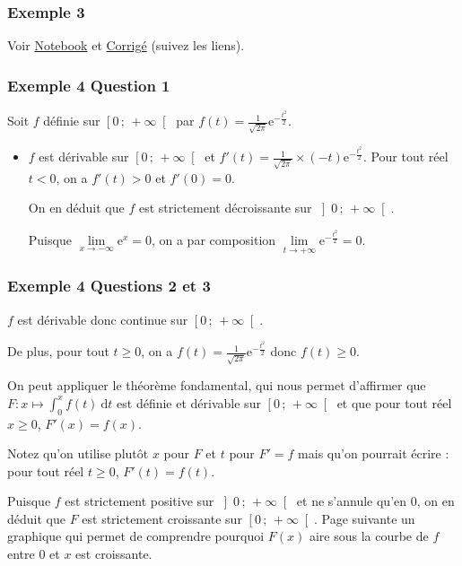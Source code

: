 \documentclass[11pt, hyperref={urlcolor=red,%
            linkcolor=blue, %
            colorlinks=true}]{beamer}
\newcommand{\Interoo}[2]{\left]#1\, ;\, #2\right[}
\newcommand{\Interfo}[2]{\left[#1\, ;\, #2\right[}
\newcommand{\dt}{\ensuremath{\text{d}t}}		%
\newcommand{\integralet}[3]{\int_{#1}^{#2} #3 \ \dt}
\begin{document}
\begin{frame}
\frametitle{Exemple 3}

Voir \href{https://mybinder.org/v2/gh/frederic-junier/TS-2019-2020/master?filepath=CalculIntegral/ressources/Cours_Calcul_Integral_2020_Eleve.ipynb}{Notebook} et  \href{https://frederic-junier.github.io/TS-2019-2020/CalculIntegral/ressources/Cours_Calcul_Integral_2020_Eleve-Corrige.pdf}{Corrigé} (suivez les liens).


\end{frame}



\begin{frame}
\frametitle{Exemple 4 Question 1}

Soit $f$ définie sur $\Interfo{0}{+\infty}$ par $f(t)=\frac{1}{\sqrt{2\pi}}\text{e}^{-\frac{t^2}{2}}$.

\begin{itemize}

\item $f$ est dérivable sur  $\Interfo{0}{+\infty}$ et $f'(t)=\frac{1}{\sqrt{2\pi}} \times (-t)\text{e}^{-\frac{t^2}{2}}$. Pour  tout réel $t<0$, on a $f'(t)>0$ et $f'(0)=0$.

On en déduit que $f$ est  strictement décroissante sur $\Interoo{0}{+\infty}$.

Puisque $\lim\limits_{x \to -\infty} \text{e}^{x}=0$, on a par composition $\lim\limits_{t \to +\infty} \text{e}^{-\frac{t^2}{2}}=0$.


\end{itemize}


\end{frame}



\begin{frame}
\frametitle{Exemple 4 Questions 2 et 3}

$f$ est dérivable donc continue  sur $\Interfo{0}{+\infty}$.

De plus, pour tout $t \geqslant 0$, on a  $f(t)=\frac{1}{\sqrt{2\pi}}\text{e}^{-\frac{t^2}{2}}$ donc $f(t) \geqslant 0$.

On peut appliquer le théorème fondamental, qui nous permet d'affirmer que  $F:x \mapsto \integralet{0}{x}{f(t)}$ est définie et dérivable sur $\Interfo{0}{+\infty}$  et que pour tout réel $x \geqslant 0$, $F'(x)=f(x)$.

Notez qu'on utilise plutôt $x$ pour $F$ et $t$ pour $F'=f$ mais qu'on pourrait écrire : pour tout réel $t \geqslant 0$, $F'(t)=f(t)$.

Puisque $f$ est strictement positive sur $\Interoo{0}{+\infty}$ et ne s'annule qu'en 0, on en déduit que $F$ est strictement croissante sur $\Interfo{0}{+\infty}$. Page suivante un graphique qui permet de comprendre pourquoi $F(x)$ aire sous la courbe de $f$ entre $0$ et $x$ est croissante.


\end{frame}
\end{document}
